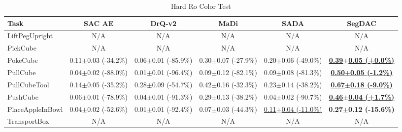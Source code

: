 \begin{table}[htbp]
\centering
\scriptsize
\caption{Hard Ro Color Test}
\label{tab:appendix_rocolortest_hard}
\begin{adjustbox}{max width=\textwidth}
\begin{tabular}{l*{5}{c}}
\toprule
\textbf{Task} & \textbf{SAC AE} & \textbf{DrQ-v2} & \textbf{MaDi} & \textbf{SADA} & \textbf{SegDAC} \\
\midrule
LiftPegUpright & N/A & N/A & N/A & N/A & N/A \\
PickCube & N/A & N/A & N/A & N/A & N/A \\
PokeCube & 0.11$\pm$0.03 \scriptsize{(-34.2\%)} & 0.06$\pm$0.01 \scriptsize{(-85.9\%)} & 0.30$\pm$0.07 \scriptsize{(-27.9\%)} & 0.20$\pm$0.06 \scriptsize{(-49.0\%)} & \textbf{\underline{0.39$\pm$0.05 \scriptsize{(+0.0\%)}}} \\
PullCube & 0.04$\pm$0.02 \scriptsize{(-88.0\%)} & 0.01$\pm$0.01 \scriptsize{(-96.4\%)} & 0.09$\pm$0.12 \scriptsize{(-82.1\%)} & 0.09$\pm$0.08 \scriptsize{(-81.3\%)} & \textbf{\underline{0.50$\pm$0.05 \scriptsize{(-1.2\%)}}} \\
PullCubeTool & 0.14$\pm$0.05 \scriptsize{(-35.2\%)} & 0.28$\pm$0.09 \scriptsize{(-54.7\%)} & 0.42$\pm$0.16 \scriptsize{(-32.3\%)} & 0.23$\pm$0.14 \scriptsize{(-38.2\%)} & \textbf{\underline{0.67$\pm$0.18 \scriptsize{(-9.0\%)}}} \\
PushCube & 0.06$\pm$0.01 \scriptsize{(-78.9\%)} & 0.04$\pm$0.01 \scriptsize{(-91.3\%)} & 0.29$\pm$0.13 \scriptsize{(-38.2\%)} & 0.04$\pm$0.02 \scriptsize{(-90.7\%)} & \textbf{\underline{0.46$\pm$0.04 \scriptsize{(+1.7\%)}}} \\
PlaceAppleInBowl & 0.04$\pm$0.02 \scriptsize{(-52.6\%)} & 0.01$\pm$0.01 \scriptsize{(-92.4\%)} & 0.07$\pm$0.03 \scriptsize{(-44.3\%)} & \underline{0.11$\pm$0.04 \scriptsize{(-11.0\%)}} & \textbf{0.27$\pm$0.12 \scriptsize{(-15.6\%)}} \\
TransportBox & N/A & N/A & N/A & N/A & N/A \\
\bottomrule
\end{tabular}
\end{adjustbox}
\end{table}

